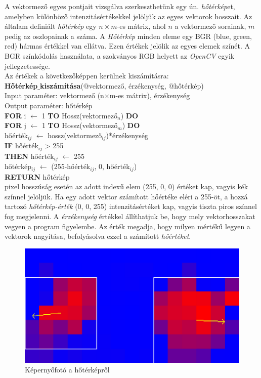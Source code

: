 
A vektormező egyes pontjait vizsgálva szerkeszthetünk egy ún. \textit{hőtérkép}et, amelyben különböző intenzitásértékekkel jelöljük az egyes vektorok hosszait. Az általam definiált \textit{hőtérkép} egy $n \times m$-es mátrix, ahol $n$ a vektormező sorainak, $m$ pedig az oszlopainak a száma. A \textit{Hőtérkép} minden eleme egy BGR (blue, green, red) hármas értékkel van ellátva. Ezen értékek jelölik az egyes elemek színét. A BGR színkódolás használata, a szokványos RGB helyett az \textit{OpenCV} egyik jellegzetessége.\\
Az értékek a következőképpen kerülnek kiszámításra:\\
\newline
\noindent \textbf{Hőtérkép$\_$kiszámítása}(@vektormező, érzékenység, @hőtérkép)\\ 
Input paraméter: vektormező (n$\times$m-es mátrix), érzékenység\\
Output paraméter: hőtérkép\\
\textbf{FOR} i $\leftarrow$ 1 \textbf{TO} Hossz(vektormező$_n$) \textbf{DO}\\
\indent \textbf{FOR} j $\leftarrow$ 1 \textbf{TO} Hossz(vektormező$_m$) \textbf{DO}\\
\indent \indent hőérték$_{ij}$ $\leftarrow$ hossz(vektormező$_{ij}$)*érzékenység\\
\indent \indent \textbf{IF} hőérték$_{ij}$ > 255\\
\indent \indent \indent \textbf{THEN} hőérték$_{ij}$ $\leftarrow$ 255\\
\indent \indent hőtérkép$_{ij}$ $\leftarrow$ (255-hőérték$_{ij}$, 0, hőérték$_{ij}$)\\
\textbf{RETURN} hőtérkép\\
 pixel hosszúság esetén az adott indexű elem (255, 0, 0) értéket kap, vagyis kék színnel jelöljük. Ha egy adott vektor számított hőértéke eléri a 255-öt, a hozzá tartozó \textit{hőtérkép-érték} (0, 0, 255) intenzitásértéket kap, vagyis tiszta piros színnel fog megjelenni.
A \textit{érzékenység} értékkel állíthatjuk be, hogy mely vektorhosszakat vegyen a program figyelembe. Az érték megadja, hogy milyen mértékű legyen a vektorok nagyítása, befolyásolva ezzel a számított \textit{hőértéket}.
\begin{figure}[h]
\centering
\includegraphics[width=11.2truecm, height=6.3truecm]{images/HeatMap_screenshot.png}
\caption{Képernyőfotó a hőtérképről}
\label{fig:heatmap}
\end{figure}
